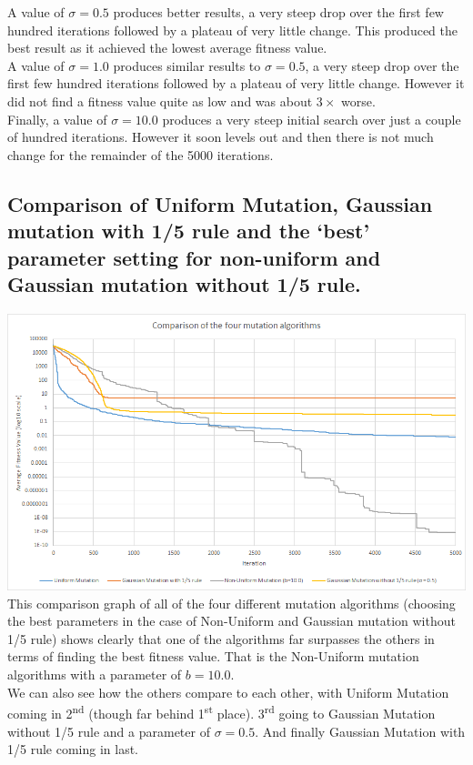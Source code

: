\documentclass{article}
\begin{document}
	A value of $\sigma=0.5$ produces better results, a very steep drop over the first few hundred iterations followed by a plateau of very little change. This produced the best result as it achieved the lowest average fitness value.\\
	
	A value of $\sigma=1.0$ produces similar results to $\sigma=0.5$, a very steep drop over the first few hundred iterations followed by a plateau of very little change. However it did not find a fitness value quite as low and was about $3\times$ worse.\\
	
	Finally, a value of $\sigma=10.0$ produces a very steep initial search over just a couple of hundred iterations. However it soon levels out and then there is not much change for the remainder of the 5000 iterations.
	
	\subsection{Comparison of Uniform Mutation, Gaussian mutation with 1/5 rule and the ‘best’ parameter setting for non-uniform and Gaussian mutation without 1/5 rule.}
	\includegraphics[width=1\textwidth]{Images/ComparisonOfAlgorithms}\\
	
	This comparison graph of all of the four different mutation algorithms (choosing the best parameters in the case of Non-Uniform and Gaussian mutation without 1/5 rule) shows clearly that one of the algorithms far surpasses the others in terms of finding the best fitness value. That is the Non-Uniform mutation algorithms with a parameter of $b=10.0$.\\
	
	We can also see how the others compare to each other, with Uniform Mutation coming in 2\textsuperscript{nd} (though far behind 1\textsuperscript{st} place). 3\textsuperscript{rd} going to Gaussian Mutation without 1/5 rule and a parameter of $\sigma=0.5$. And finally Gaussian Mutation with 1/5 rule coming in last.
	
	
	
\end{document}
